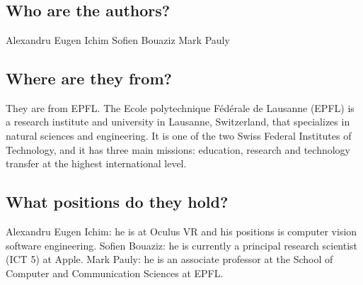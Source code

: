 \documentclass[12pt,a4paper,titlepage]{article}
\begin{document}
\section{}{
\subsection{Who are the authors?}{
Alexandru Eugen Ichim\newline
Sofien Bouaziz\newline
Mark Pauly\newline
}
\subsection{ Where are they from? }{
They are from EPFL.\newline
The Ecole polytechnique Fédérale de Lausanne (EPFL) is a research institute and university in Lausanne, Switzerland, that specializes in natural sciences and engineering. It is one of the two Swiss Federal Institutes of Technology, and it has three main missions: education, research and technology transfer at the highest international level.
}
\subsection{What positions do they hold?}{
Alexandru Eugen Ichim: he is at Oculus VR and his positions is computer vision software engineering.\newline
Sofien Bouaziz: he is currently a principal research scientist (ICT 5) at Apple.\newline
Mark Pauly: he is an associate professor at the School of Computer and Communication Sciences at EPFL. 
}
}
\end{document}
